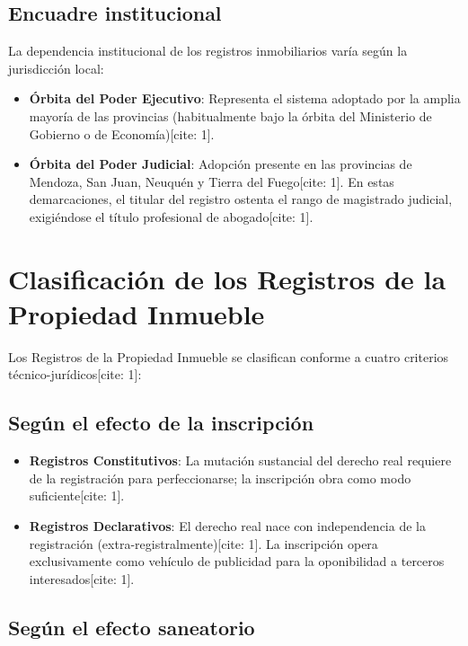 \documentclass[12pt,oneside]{book}
\begin{document}
\subsection{Encuadre institucional}

La dependencia institucional de los registros inmobiliarios varía según la jurisdicción local:

\begin{itemize}
    \item \textbf{Órbita del Poder Ejecutivo}: Representa el sistema adoptado por la amplia mayoría de las provincias (habitualmente bajo la órbita del Ministerio de Gobierno o de Economía)[cite: 1].
    \item \textbf{Órbita del Poder Judicial}: Adopción presente en las provincias de Mendoza, San Juan, Neuquén y Tierra del Fuego[cite: 1]. En estas demarcaciones, el titular del registro ostenta el rango de magistrado judicial, exigiéndose el título profesional de abogado[cite: 1].
\end{itemize}

\section{Clasificación de los Registros de la Propiedad Inmueble}

Los Registros de la Propiedad Inmueble se clasifican conforme a cuatro criterios técnico-jurídicos[cite: 1]:

\subsection{Según el efecto de la inscripción}

\begin{itemize}
    \item \textbf{Registros Constitutivos}: La mutación sustancial del derecho real requiere de la registración para perfeccionarse; la inscripción obra como modo suficiente[cite: 1].
    \item \textbf{Registros Declarativos}: El derecho real nace con independencia de la registración (extra-registralmente)[cite: 1]. La inscripción opera exclusivamente como vehículo de publicidad para la oponibilidad a terceros interesados[cite: 1].
\end{itemize}

\subsection{Según el efecto saneatorio}
\end{document}

